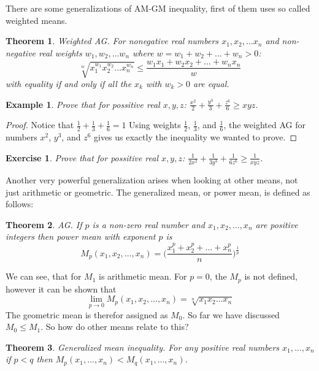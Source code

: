 \documentclass[11pt,a5paper]{article}
\newtheorem{theorem}{Example}
\newtheorem{exercise}{Exercise}
\newtheorem*{Theorem}{Theorem}
\begin{document}
There are some generalizations of AM-GM inequality, first of them uses 
so called weighted means. 
\begin{Theorem}\emph{Weighted AG.} 
	For nonegative real numbers $x_1, x_2, \dots x_n$ and non-negative real 
	weights $w_1, w_2, \dots w_n$ where $w = w_1 + w_2 + \dots + w_n > 0$:
\[\sqrt[w]{x_1^{w_1}x_2^{w_2}\dots x_n^{w_n}} \le  \frac{w_1x_1 + w_2x_2 + \dots + w_nx_n}{w}\] 
	with equality if and only if all the $x_k$ with $w_k > 0$ are equal. \\
\end{Theorem}

\begin{theorem}
	Prove that for possitive real $x, y, z$: 
	$\frac{x^2}{2} + \frac{y^3}{3} + \frac{z^6}{6} \ge xyz$.
\end{theorem}

\begin{proof} 
	Notice that $\frac{1}{2} + \frac{1}{3} + \frac{1}{6} = 1$ Using weights $\frac{1}{2}$, $\frac{1}{3}$, and $\frac{1}{6}$, the weighted AG for numbers $x^2$, $y^3$, and $z^6$ gives us exactly the inequality we wanted to prove.
\end{proof}

\begin{exercise} Prove that for possitive real $x, y, z$: 
	$\frac{1}{2x^2} + \frac{1}{3y^3} + \frac{1}{6z^6} \ge \frac{1}{xyz}$.
\end{exercise}

Another very powerful generalization arises when looking at other means, 
not just arithmetic or geometric. The generalized mean, or power mean, 
is defined as follows:

\begin{Theorem} \emph{AG.}
If $p$ is a non-zero real number and $x_1, x_2, \dots , x_n$ are positive 
integers then power mean with exponent $p$ is
\[M_p(x_1, x_2, \dots, x_n) 
= \bigg(\dfrac{x_1^p + x_2^p + \dots + x_n^p}{n}\bigg)^\frac{1}{p}\]
\end{Theorem}

\noindent We can see, that for $M_1$ is arithmetic mean. For $p=0$, 
the $M_p$ is not defined, however it can be shown that 
\[\lim_{p\to 0} M_p(x_1, x_2, \dots, x_n) = \sqrt[n]{x_1x_2\dots x_n}\]
The geometric mean is therefor assigned as $M_0$. So far we have discussed 
$M_0 \le M_1$. So how do other means relate to this?

\begin{Theorem} \emph{Generalized mean inequality.}
For any positive real numbers $x_1, \dots,  x_n$ if $p < q$ then $M_p(x_1, \dots, x_n) < M_q(x_1, \dots, x_n)$.

\end{Theorem}
\end{document}
